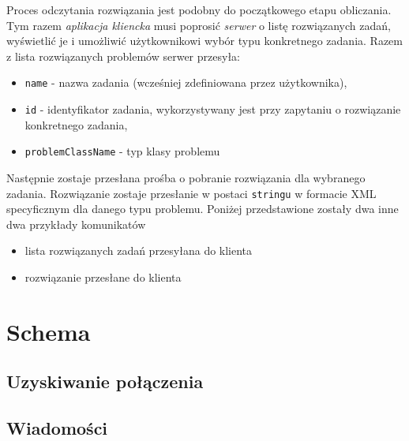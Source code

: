 \documentclass[12pt,a4paper,titlepage]{report}
\begin{document}
    Proces odczytania rozwiązania jest podobny do początkowego etapu obliczania. Tym razem \textit{aplikacja kliencka} musi poprosić \textit{serwer} o listę rozwiązanych zadań, wyświetlić je i umożliwić użytkownikowi wybór typu konkretnego zadania. 
    Razem z lista rozwiązanych problemów serwer przesyła:
    \begin{itemize}
    	\item \verb+name+ - nazwa zadania (wcześniej zdefiniowana przez użytkownika),
    	\item \verb+id+ - identyfikator zadania, wykorzystywany jest przy zapytaniu o rozwiązanie konkretnego zadania,
    	\item \verb+problemClassName+ - typ klasy problemu
    \end{itemize}
    Następnie zostaje przesłana prośba o pobranie rozwiązania dla wybranego zadania. Rozwiązanie zostaje przesłanie w postaci
    \verb+stringu+ w formacie XML specyficznym dla danego typu problemu.
    Poniżej przedstawione zostały dwa inne dwa przykłady komunikatów
    \begin{itemize}
    \item lista rozwiązanych zadań przesyłana do klienta
				
	\item rozwiązanie przesłane do klienta
				
   \end{itemize}
    
   
    
  

	\section{Schema}
		\subsection{Uzyskiwanie połączenia}
		
		\subsection{Wiadomości}
		
	
	
\end{document}
